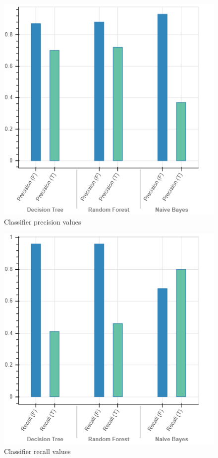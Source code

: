 \documentclass[10pt, conference, compsocconf]{IEEEtran}
\begin{document}
\begin{figure}
  \includegraphics[scale=0.45]{precision}
  \centering
  \caption{Classifier precision values}
  \label{fig:precision}
\end{figure}

\begin{figure}
  \includegraphics[scale=0.45]{recall}
  \centering
  \caption{Classifier recall values}
  \label{fig:recall}
\end{figure}
\end{document}
